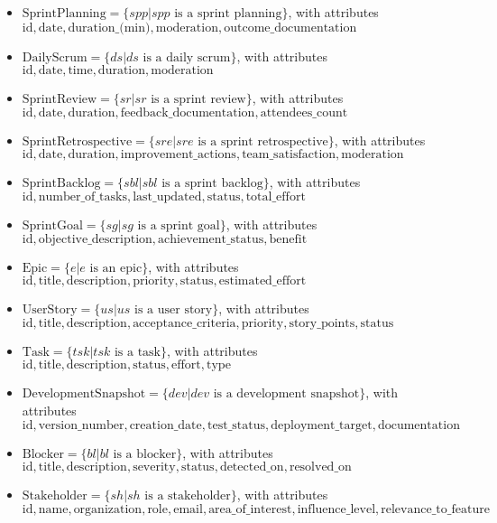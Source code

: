 \documentclass[11pt]{article}
\begin{document}
\begin{itemize}
    \item $\text{SprintPlanning} = \{spp | spp \text{ is a sprint planning}\}$, with attributes $\text{id}, \text{date}, \text{duration\_(min)}, \text{moderation}, \text{outcome\_documentation}$
    \item $\text{DailyScrum} = \{ds | ds \text{ is a daily scrum}\}$, with attributes $\text{id}, \text{date}, \text{time}, \text{duration}, \text{moderation}$
    \item $\text{SprintReview} = \{sr | sr \text{ is a sprint review}\}$, with attributes $\text{id}, \text{date}, \text{duration}, \text{feedback\_documentation}, \text{attendees\_count}$
    \item $\text{SprintRetrospective} = \{sre | sre \text{ is a sprint retrospective}\}$, with attributes $\text{id}, \text{date}, \text{duration}, \text{improvement\_actions}, \text{team\_satisfaction}, \text{moderation}$
    \item $\text{SprintBacklog} = \{sbl | sbl \text{ is a sprint backlog}\}$, with attributes $\text{id}, \text{number\_of\_tasks}, \text{last\_updated}, \text{status}, \text{total\_effort}$
    \item $\text{SprintGoal} = \{sg | sg \text{ is a sprint goal}\}$, with attributes $\text{id}, \text{objective\_description}, \text{achievement\_status}, \text{benefit}$
    \item $\text{Epic} = \{e | e \text{ is an epic}\}$, with attributes $\text{id}, \text{title}, \text{description}, \text{priority}, \text{status}, \text{estimated\_effort}$
    \item $\text{UserStory} = \{us | us \text{ is a user story}\}$, with attributes $\text{id}, \text{title}, \text{description}, \text{acceptance\_criteria}, \text{priority}, \text{story\_points}, \text{status}$
    \item $\text{Task} = \{tsk | tsk \text{ is a task}\}$, with attributes $\text{id}, \text{title}, \text{description}, \text{status}, \text{effort}, \text{type}$
    \item $\text{DevelopmentSnapshot} = \{dev | dev \text{ is a development snapshot}\}$, with attributes $\text{id}, \text{version\_number}, \text{creation\_date}, \text{test\_status}, \text{deployment\_target}, \text{documentation}$
    \item $\text{Blocker} = \{bl | bl \text{ is a blocker}\}$, with attributes $\text{id}, \text{title}, \text{description}, \text{severity}, \text{status}, \text{detected\_on}, \text{resolved\_on}$
    \item $\text{Stakeholder} = \{sh | sh \text{ is a stakeholder}\}$, with attributes $\text{id}, \text{name}, \text{organization}, \text{role}, \text{email}, \text{area\_of\_interest}, \text{influence\_level}, \text{relevance\_to\_feature}$

\end{itemize}
\end{document}
